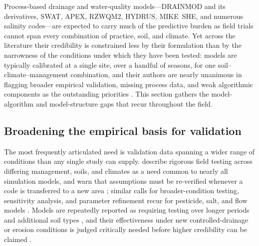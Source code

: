 Process-based drainage and water-quality models---DRAINMOD and its
derivatives, SWAT, APEX, RZWQM2, HYDRUS, MIKE~SHE, and numerous salinity
codes---are expected to carry much of the predictive burden as field trials
cannot span every combination of practice, soil, and climate. Yet across the
literature their credibility is constrained less by their formulation than by
the narrowness of the conditions under which they have been tested: models are
typically calibrated at a single site, over a handful of seasons, for one
soil--climate--management combination, and their authors are nearly unanimous
in flagging broader empirical validation, missing process data, and weak
algorithmic components as the outstanding priorities
\parencite{Li2006,Qi2015,Youssef2006,Radcliffe2015,SKAGGS1994}. This section
gathers the model-algorithm and model-structure gaps that recur throughout the
field.

\subsection{Broadening the empirical basis for validation}

The most frequently articulated need is validation data spanning a wider range
of conditions than any single study can supply. \textcite{Youssef2006} describe
rigorous field testing across differing management, soils, and climates as a
need common to nearly all simulation models, and warn that assumptions must be
re-verified whenever a code is transferred to a new area
\parencite{Kelleners2000}; similar calls for broader-condition testing,
sensitivity analysis, and parameter refinement recur for pesticide, salt, and
flow models \parencite{Branger2009,Hirekhan2007,Yang2008b,Xian2017}. Models are
repeatedly reported as requiring testing over longer periods and additional soil
types \parencite{Salazar2009,Li2026}, and their effectiveness under new
controlled-drainage or erosion conditions is judged critically needed before
higher credibility can be claimed \parencite{Negm2017,Turunen2020}.


